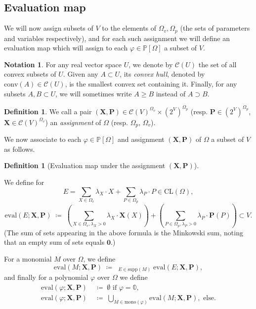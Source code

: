 \documentclass[10pt]{amsart}
\theoremstyle{plain}
\theoremstyle{definition}
\newtheorem{definition}[lemma]{Definition}
\newtheorem{notation}[lemma]{Notation}
\providecommand{\cC}[0]{\ensuremath{\mathcal C}\xspace}
\providecommand{\bP}[0]{\ensuremath{\mathbf P}\xspace}
\providecommand{\bX}[0]{\ensuremath{\mathbf X}\xspace}
\let\geq\geqslant
\providecommand{\defeq}[0]{\ensuremath{\;\coloneqq\;}\xspace}
\providecommand{\Cmult}[0]{\ensuremath{\mathop{\mathring{\bigstar}}}\xspace}
\providecommand{\CL}[0]{\ensuremath{\mathrm{CL}}\xspace}
\providecommand{\conv}[1]{\ensuremath{\mathrm{conv}{\left({#1}\right)}\xspace}}
\providecommand{\convset}[0]{\ensuremath{\cC}\xspace}
\providecommand{\evalmap}[0]{\ensuremath{\mathrm{eval}}\xspace}
\providecommand{\mono}[0]{\ensuremath{\mathrm{mono}}\xspace}
\providecommand{\elem}[0]{\ensuremath{\mathrm{supp}}\xspace}
\begin{document}
\subsection{Evaluation map}
\label{subsec:eval-map}
We will now assign subsets of 
$V$
to the elements of $\Omega_v,\Omega_p$ (the sets of parameters and variables respectively), and 
for each such assignment we will
define an evaluation map 
which will assign to each $\varphi \in \mathbb{P}[\Omega]$ a subset of $V$.

\begin{notation}
For any real vector space $U$, we denote by  $\convset(U)$ the set of all convex subsets of $U$. 
Given any $A\subset U$, its {\em convex hull}, denoted by $\conv A\in\convset(U)$, is the smallest convex set containing it. 
Finally, for any subsets $A,B \subset U$,
we will sometimes write $A\geq B$ instead of $A \supset B$.
\end{notation}

\begin{definition}
\label{def:assignment}
We call a pair $(\bX,\bP) \in \convset(V)^{\Omega_v} \times  (2^V)^{\Omega_p}$ (resp. $\bP \in (2^V)^{\Omega_p}$, $\bX \in \convset(V)^{\Omega_v}$)
an \emph{assignment} of $\Omega$ (resp. $\Omega_p$, $\Omega_v$).
\end{definition}

We now associate to each $\varphi \in \mathbb{P}[\Omega]$ and
assignment $(\bX,\bP)$ of $\Omega$ a subset of $V$ as follows.

\begin{definition}[Evaluation map under the assignment $(\bX,\bP)$]
\label{def:eval-map}

We define for 
\[
E = {\sum_{X \in \Omega_v} \lambda_X \cdot X} + {\sum_{P \in \Omega_p} \lambda_P \cdot P} \in \CL(\Omega),
\]
\[
\evalmap(E;\bX,\bP) \defeq \left(\sum_{X \in \Omega_v, \lambda_X > 0} \lambda_X\cdot\bX(X)\right) + \left(\sum_{P \in \Omega_p, \lambda_P > 0}\lambda_{P}\cdot \bP(P)
\right) \subset V.
\]
(The sum of sets appearing in  the above formula is the Minkowski sum, noting that an empty sum of sets equals $\mathbf{0}$.)

For a monomial $M$
over $\Omega$, we define
\[
\evalmap(M;\bX,\bP) \defeq 
\Cmult_{E \in \elem(M)}\evalmap(E;\bX,\bP),
\]
and finally for a polynomial 
$\varphi$
over $\Omega$
we define
\begin{align*}
\evalmap(\varphi;\bX,\bP) &\defeq \emptyset \text{ if $\varphi = \mathbb{0}$}, \\
\evalmap(\varphi;\bX,\bP) &\defeq 
\bigcup_{M \in \mono(\varphi)} \evalmap(M;\bX,\bP), \text{ else.}
\end{align*}
\end{definition}
\end{document}
